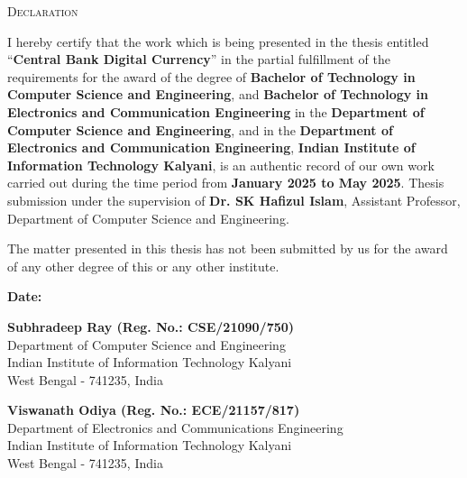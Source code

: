 \cleardoublepage
\thispagestyle{empty}
\begin{center}
    {\LARGE \textsc{Declaration}}
\end{center}
\vspace{0.3cm}


I hereby certify that the work which is being presented in the thesis entitled “\textbf{Central Bank Digital Currency}” in the partial fulfillment of the requirements for the award of the degree of \textbf{Bachelor of Technology in Computer Science and Engineering}, and \textbf{Bachelor of Technology in Electronics and Communication Engineering} in the \textbf{Department of Computer Science and Engineering}, and in the \textbf{Department of Electronics and Communication Engineering}, \textbf{Indian Institute of Information Technology Kalyani}, is an authentic record of our own work carried out during the time period from \textbf{January 2025 to May 2025}. Thesis submission under the supervision of \textbf{Dr. SK Hafizul Islam}, Assistant Professor, Department of Computer Science and Engineering.

\noindent
The matter presented in this thesis has not been submitted by us for the award of any other degree of this or any other institute.

\vspace{2cm}

\noindent
\begin{minipage}[t]{0.45\textwidth}
\textbf{Date:}
\end{minipage}
\vspace{0em}

\begin{flushright}
\textbf{Subhradeep Ray (Reg. No.: CSE/21090/750)}\\
Department of Computer Science and Engineering\\
Indian Institute of Information Technology Kalyani\\
West Bengal - 741235, India
\end{flushright}

\vspace{3em}

\begin{flushright}
\textbf{Viswanath Odiya (Reg. No.: ECE/21157/817)}\\
Department of Electronics and Communications Engineering\\
Indian Institute of Information Technology Kalyani\\
West Bengal - 741235, India
\end{flushright}